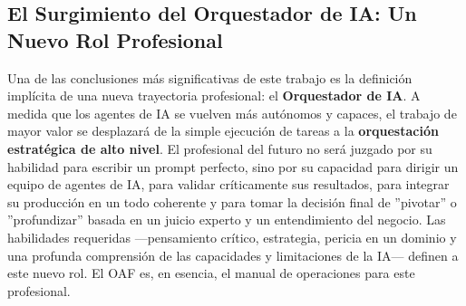 \documentclass[11pt, a4paper]{article}
\begin{document}
\subsection{El Surgimiento del Orquestador de IA: Un Nuevo Rol Profesional}
Una de las conclusiones más significativas de este trabajo es la definición implícita de una nueva trayectoria profesional: el \textbf{Orquestador de IA}. A medida que los agentes de IA se vuelven más autónomos y capaces, el trabajo de mayor valor se desplazará de la simple ejecución de tareas a la \textbf{orquestación estratégica de alto nivel}. El profesional del futuro no será juzgado por su habilidad para escribir un prompt perfecto, sino por su capacidad para dirigir un equipo de agentes de IA, para validar críticamente sus resultados, para integrar su producción en un todo coherente y para tomar la decisión final de ''pivotar'' o ''profundizar'' basada en un juicio experto y un entendimiento del negocio. Las habilidades requeridas —pensamiento crítico, estrategia, pericia en un dominio y una profunda comprensión de las capacidades y limitaciones de la IA— definen a este nuevo rol. El OAF es, en esencia, el manual de operaciones para este profesional.
\end{document}
